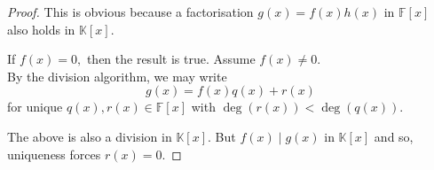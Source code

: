 \begin{proof}
    \forward This is obvious because a factorisation $g(x) = f(x)h(x)$ in $\mathbb{F}[x]$ also holds in $\mathbb{K}[x].$

    \backward If $f(x) = 0,$ then the result is true. Assume $f(x) \neq 0.$ \\
    By the division algorithm, we may write
    \begin{equation*} 
        g(x) = f(x)q(x) + r(x)
    \end{equation*}
    for unique $q(x), r(x) \in \mathbb{F}[x]$ with $\deg(r(x)) < \deg(q(x)).$

    The above is also a division in $\mathbb{K}[x].$ But $f(x) \mid g(x)$ in $\mathbb{K}[x]$ and so, uniqueness forces $r(x) = 0.$
\end{proof} 